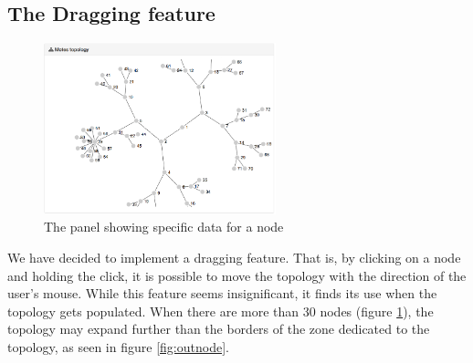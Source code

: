 \subsection{The Dragging feature}

\begin{figure}[!h]
	\centering
	\includegraphics[width=0.6\textwidth]{res/populated.png}
	\caption{The panel showing specific data for a node}
	\label{fig:populated}
\end{figure}


We have decided to implement a dragging feature. That is, by clicking on a node and holding the click, it is possible to move the topology with the direction of the user's mouse. While this feature seems insignificant, it finds its use when the topology gets populated. When there are more than 30 nodes (figure \ref{fig:populated}), the topology may expand further than the borders of the zone dedicated to the topology, as seen in figure \ref{fig:outnode}.




